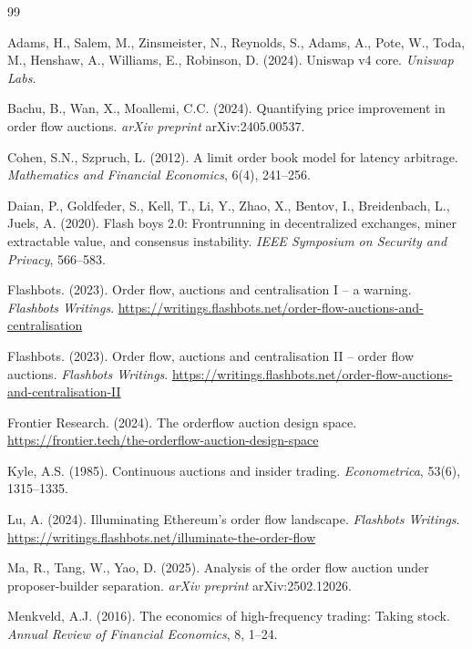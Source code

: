 \documentclass[12pt,a4paper]{article}
\begin{document}
\begin{thebibliography}{99}

Adams, H., Salem, M., Zinsmeister, N., Reynolds, S., Adams, A., Pote, W., Toda, M., Henshaw, A., Williams, E., Robinson, D. (2024). Uniswap v4 core. \textit{Uniswap Labs}.

Bachu, B., Wan, X., Moallemi, C.C. (2024). Quantifying price improvement in order flow auctions. \textit{arXiv preprint} arXiv:2405.00537.

Cohen, S.N., Szpruch, L. (2012). A limit order book model for latency arbitrage. \textit{Mathematics and Financial Economics}, 6(4), 241--256.

Daian, P., Goldfeder, S., Kell, T., Li, Y., Zhao, X., Bentov, I., Breidenbach, L., Juels, A. (2020). Flash boys 2.0: Frontrunning in decentralized exchanges, miner extractable value, and consensus instability. \textit{IEEE Symposium on Security and Privacy}, 566--583.

Flashbots. (2023). Order flow, auctions and centralisation I -- a warning. \textit{Flashbots Writings}. \url{https://writings.flashbots.net/order-flow-auctions-and-centralisation}

Flashbots. (2023). Order flow, auctions and centralisation II -- order flow auctions. \textit{Flashbots Writings}. \url{https://writings.flashbots.net/order-flow-auctions-and-centralisation-II}

Frontier Research. (2024). The orderflow auction design space. \url{https://frontier.tech/the-orderflow-auction-design-space}

Kyle, A.S. (1985). Continuous auctions and insider trading. \textit{Econometrica}, 53(6), 1315--1335.

Lu, A. (2024). Illuminating Ethereum's order flow landscape. \textit{Flashbots Writings}. \url{https://writings.flashbots.net/illuminate-the-order-flow}

Ma, R., Tang, W., Yao, D. (2025). Analysis of the order flow auction under proposer-builder separation. \textit{arXiv preprint} arXiv:2502.12026.

Menkveld, A.J. (2016). The economics of high-frequency trading: Taking stock. \textit{Annual Review of Financial Economics}, 8, 1--24.


\end{thebibliography}
\end{document}
